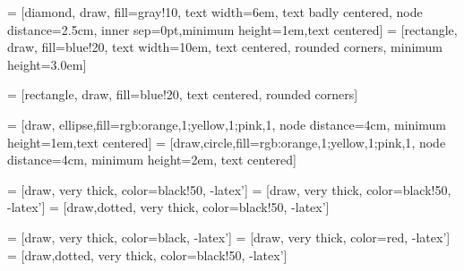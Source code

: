 
\usepackage{amsmath,amssymb,latexsym,float,epsfig,hyperref}
\usepackage{framed,color,url,fancybox,fullpage,booktabs,subfigure,wrapfig,chngpage,setspace}
\usepackage[latin1]{inputenc}
\usepackage{tikz}

\usetikzlibrary{shapes,arrows}
\usetikzlibrary{arrows,positioning,mindmap} 
\usetikzlibrary{calc,trees,positioning,arrows,chains,shapes.geometric,%
decorations.pathreplacing,decorations.pathmorphing,shapes,%
matrix,shapes.symbols,plotmarks,decorations.markings,shadows}
\usetikzlibrary{patterns}

 = [diamond, draw, fill=gray!10,
  text width=6em, text badly centered, node distance=2.5cm, 
  inner sep=0pt,minimum height=1em,text centered]
 = [rectangle, draw, fill=blue!20,
  text width=10em, text centered, rounded corners, minimum height=3.0em]

 = [rectangle, draw, fill=blue!20, text centered, rounded corners]

 = [draw, ellipse,fill={rgb:orange,1;yellow,1;pink,1}, node distance=4cm,
    minimum height=1em,text centered]
 = [draw,circle,fill={rgb:orange,1;yellow,1;pink,1}, 
  node distance=4cm, minimum height=2em, text centered]

 = [draw, very thick, color=black!50, -latex']
 = [draw, very thick, color=black!50, -latex']
 = [draw,dotted, very thick, color=black!50, -latex']


 = [draw, very thick, color=black, -latex']
 = [draw, very thick, color=red, -latex']
 = [draw,dotted, very thick, color=black!50, -latex']






